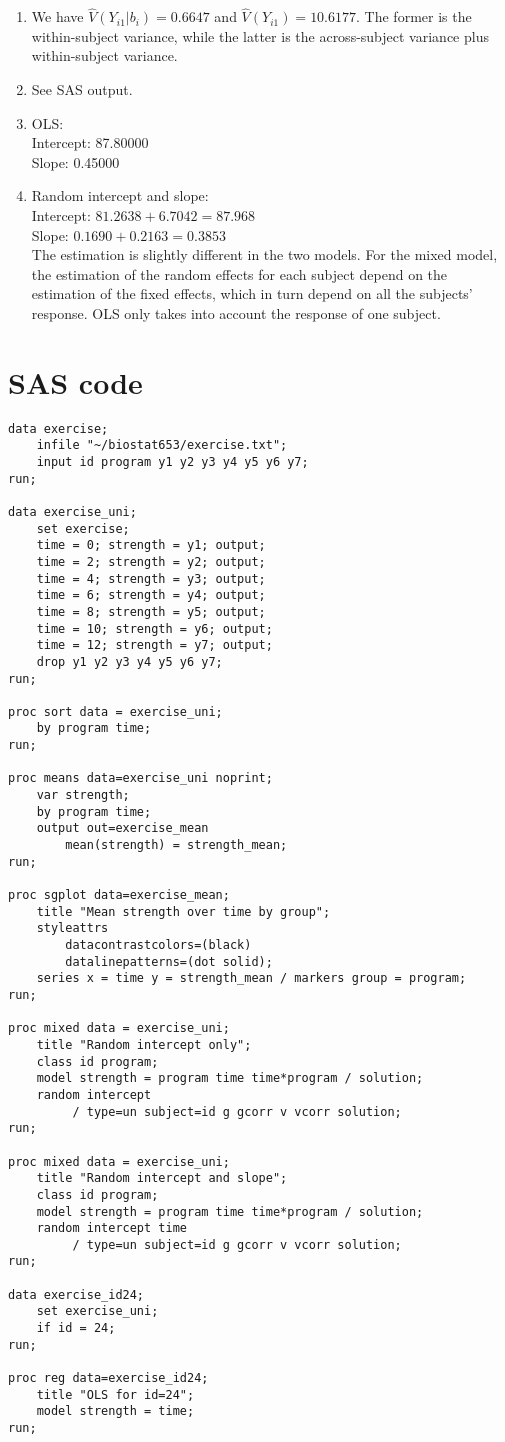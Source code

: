 \documentclass{article}
\begin{document}
\begin{enumerate}
  \item We have $\hat{V}(Y_{i1} | b_i) = 0.6647$ and $\hat{V}(Y_{i1}) = 10.6177$.
    The former is the within-subject variance,
    while the latter is the across-subject variance plus within-subject variance.
  \item See SAS output.
  \item OLS: \\
    Intercept: 87.80000 \\
    Slope: 0.45000
  \item Random intercept and slope: \\
    Intercept: $81.2638 + 6.7042 = 87.968$ \\
    Slope: $0.1690 + 0.2163 = 0.3853$ \\
    The estimation is slightly different in the two models.
    For the mixed model, the estimation of the random effects for each subject depend on the estimation of the fixed effects,
    which in turn depend on all the subjects' response.
    OLS only takes into account the response of one subject.
\end{enumerate}

\section{SAS code}


\begin{verbatim}
data exercise;
	infile "~/biostat653/exercise.txt";
	input id program y1 y2 y3 y4 y5 y6 y7;
run;

data exercise_uni;
	set exercise;
	time = 0; strength = y1; output;
	time = 2; strength = y2; output;
	time = 4; strength = y3; output;
	time = 6; strength = y4; output;
	time = 8; strength = y5; output;
	time = 10; strength = y6; output;
	time = 12; strength = y7; output;
	drop y1 y2 y3 y4 y5 y6 y7;
run;

proc sort data = exercise_uni;
	by program time;
run;

proc means data=exercise_uni noprint;
	var strength;
	by program time;
	output out=exercise_mean
		mean(strength) = strength_mean;
run;

proc sgplot data=exercise_mean;
	title "Mean strength over time by group";
  	styleattrs
		datacontrastcolors=(black) 
     	datalinepatterns=(dot solid);
	series x = time y = strength_mean / markers group = program;
run;

proc mixed data = exercise_uni;
	title "Random intercept only";
	class id program;
	model strength = program time time*program / solution;
	random intercept
		 / type=un subject=id g gcorr v vcorr solution;
run;

proc mixed data = exercise_uni;
	title "Random intercept and slope";
	class id program;
	model strength = program time time*program / solution;
	random intercept time
		 / type=un subject=id g gcorr v vcorr solution;
run;

data exercise_id24;
	set exercise_uni;
	if id = 24;
run;

proc reg data=exercise_id24;
	title "OLS for id=24";
	model strength = time;
run;
	
\end{verbatim}
\end{document}
